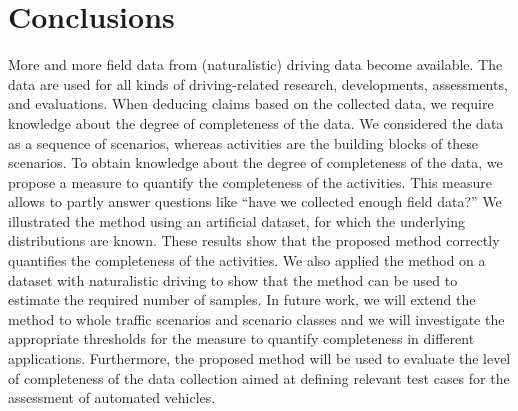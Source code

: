 \section{Conclusions}
\label{sec:conclusion}

More and more field data from (naturalistic) driving data become available. The data are used for all kinds of driving-related research, developments, assessments, and evaluations. When deducing claims based on the collected data, we require knowledge about the degree of completeness of the data. 
We considered the data as a sequence of scenarios, whereas activities are the building blocks of these scenarios. To obtain knowledge about the degree of completeness of the data, we propose a measure to quantify the completeness of the activities. This measure allows to partly answer questions like ``have we collected enough field data?'' 
We illustrated the method using an artificial dataset, for which the underlying distributions are known. These results show that the proposed method correctly quantifies the completeness of the activities. We also applied the method on a dataset with naturalistic driving to show that the method can be used to estimate the required number of samples.
In future work, we will extend the method to whole traffic scenarios and scenario classes and we will investigate the appropriate thresholds for the measure to quantify completeness in different applications. Furthermore, the proposed method will be used to evaluate the level of completeness of the data collection aimed at defining relevant test cases for the assessment of automated vehicles.
